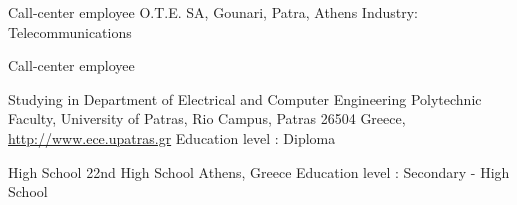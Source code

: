 \documentclass[arial, english, nologo, notitle, totpages]{europecv2013}
\begin{document}
\begin{europecv}
	{Call-center employee}
    {O.T.E. SA, Gounari, Patra, Athens}
    {Industry: Telecommunications}
    {
    \begin{small}
    	Call-center employee
	\end{small}
    }



	{Studying in Department of Electrical and Computer Engineering}
    {Polytechnic Faculty, University of Patras, Rio Campus, Patras 26504 Greece, {\tiny \url{http://www.ece.upatras.gr}}}
    {Education level : Diploma}
    {}

	{High School}
    {22nd High School Athens, Greece}
    {Education level : Secondary - High School}
    {}


\ecvitem{}{}
\ecvlanguage{}{\ecvCTwo}{\ecvCTwo}{\ecvCTwo}{\ecvCTwo}{\ecvCTwo}
\ecvlanguagefooter[10pt]{}



\end{europecv}
\end{document}

